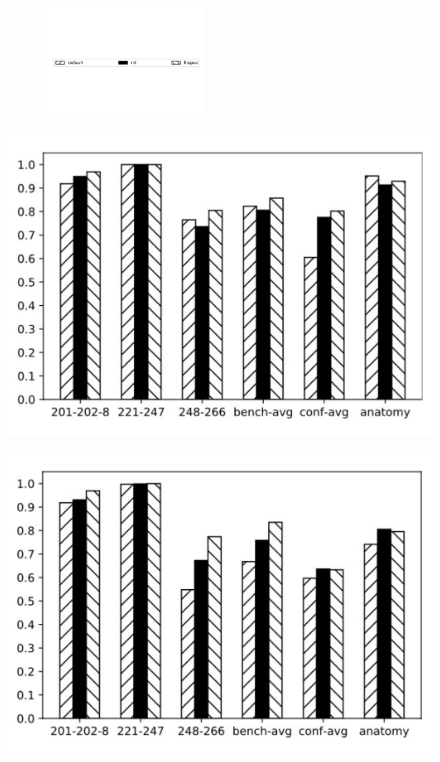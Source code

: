 \documentclass[twoside]{article}
\begin{document}
\begin{figure}[htb!]\centering
\begin{subfigure}{\textwidth}
	\centering
	\includegraphics[width=0.45\textwidth]{figures/t_legend.pdf}
\end{subfigure}
\begin{minipage}{0.49\textwidth}
	\centering
	\includegraphics[width=\textwidth]{data_figs/MulRegress_Falcon_AO_P.pdf}
	\label{fig:MulRegress_Falcon_AO_P}
\end{minipage}
\begin{minipage}{0.49\textwidth}
	\centering
	\includegraphics[width=\textwidth]{data_figs/MulRegress_Falcon_AO_R.pdf}
	\label{fig:MulRegress_Falcon_AO_R}
\end{minipage}
\end{figure}
\end{document}
